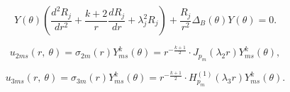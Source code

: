 $$


Y(\theta)\left(\frac{d^2R_j}{dr^2}+\frac{k+2}{r}\frac{dR_j}{dr}+


\lambda_j^2R_j\right)+


\frac{R_j}{r^2}\Delta_B(\theta)Y(\theta)=0.


$$





$$


u_{2ms}(r,\ \theta)=\sigma_{2m}(r)Y_{ms}^k(\theta)=r^{-\frac{k+1}{2}}


\cdot J_{p_m}(\lambda_2 r)Y_{ms}^{k}(\theta),


$$


$$


u_{3ms}(r,\ \theta)=\sigma_{3m}(r)Y_{ms}^k(\theta)=r^{-\frac{k+1}{2}}


\cdot H_{p_m}^{(1)}(\lambda_3 r)Y_{ms}^{k}(\theta).


$$





























